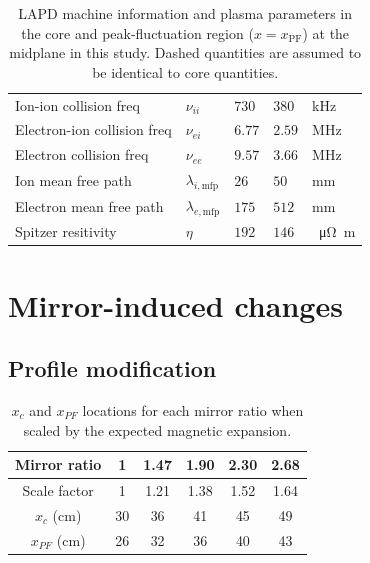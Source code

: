 \begin{table}
\begin{tabular}{l l l l l}
        Ion-ion collision freq & $\nu_{ii}$ & $730$ & $380$ & kHz \\
        Electron-ion collision freq & $\nu_{ei}$ & $6.77$ & $2.59$ & MHz \\
        Electron collision freq & $\nu_{ee}$ & $9.57$ & $3.66$ & MHz \\
        Ion mean free path & $\lambda_{i,\text{mfp}}$ & $26$ & $50$ & mm \\
        Electron mean free path & $\lambda_{e, \text{mfp}}$ & $175$ & $512$ & mm \\
        Spitzer resitivity &  $\eta$ & $192$ & $146$ & \SI{}{\micro \ohm \meter} \\
        
    \end{tabular}
    \caption{LAPD machine information and plasma parameters in the core and peak-fluctuation region ($x=x_\text{PF}$) at the midplane in this study. Dashed quantities are assumed to be identical to core quantities.}
    \label{tab:plasma-parameters}
\end{table}

\section{\label{sec:changes}Mirror-induced changes}

\subsection{Profile modification}

\begin{table}
    \centering
    \begin{tabular}{c c c c c c}
         Mirror ratio & 1 & 1.47 & 1.90 & 2.30 & 2.68 \\
         \hline
         Scale factor & 1 & 1.21 & 1.38 & 1.52 & 1.64\\
         $x_{c}$ (cm) & 30 & 36 & 41 & 45 & 49 \\
         $x_{PF}$ (cm) & 26 & 32 & 36 & 40 & 43 \\
    \end{tabular}
    \caption{$x_c$ and $x_{PF}$ locations for each mirror ratio when scaled by the expected magnetic expansion.}
    \label{tab:x_PF}
\end{table}

